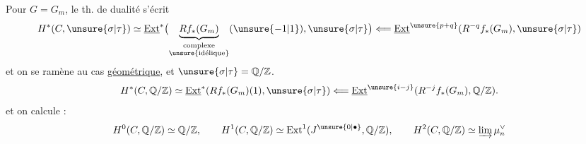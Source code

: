 Pour $G=G_m$, le th. de dualité s'écrit 
\[
H^*(C,\unsure{\sigma|\tau})\simeq
\underline{\operatorname{Ext}}^*\bigl(\underbrace{Rf_*(G_m)}_{\substack{\text{complexe}\\\text{\unsure{idélique}}}}(\unsure{-1|1}),\unsure{\sigma|\tau}\bigr)
\Longleftarrow\underline{\operatorname{Ext}}^{\unsure{p+q}}(R^{-q}f_*(G_m),\unsure{\sigma|\tau})
\]
et on se ramène au cas \uline{géométrique}, et $\unsure{\sigma|\tau}=\mathbb Q/\mathbb Z$.
\[
H^*(C,\mathbb Q/\mathbb Z)\simeq\underline{\operatorname{Ext}}^*(Rf_*(G_m)(1),\unsure{\sigma|\tau})
\Longleftarrow\underline{\operatorname{Ext}}^{\unsure{i-j}}(R^{-j}f_*(G_m),\mathbb Q/\mathbb Z).
\]
et on calcule :
\[
H^0(C,\mathbb Q/\mathbb Z)\simeq\mathbb Q/\mathbb Z,\qquad
H^1(C,\mathbb Q/\mathbb Z)\simeq\operatorname{Ext}^1(J^{\unsure{0|\bullet}},\mathbb Q/\mathbb Z),\qquad
H^2(C,\mathbb Q/\mathbb Z)\simeq\varinjlim\mu_n^\vee
\]

